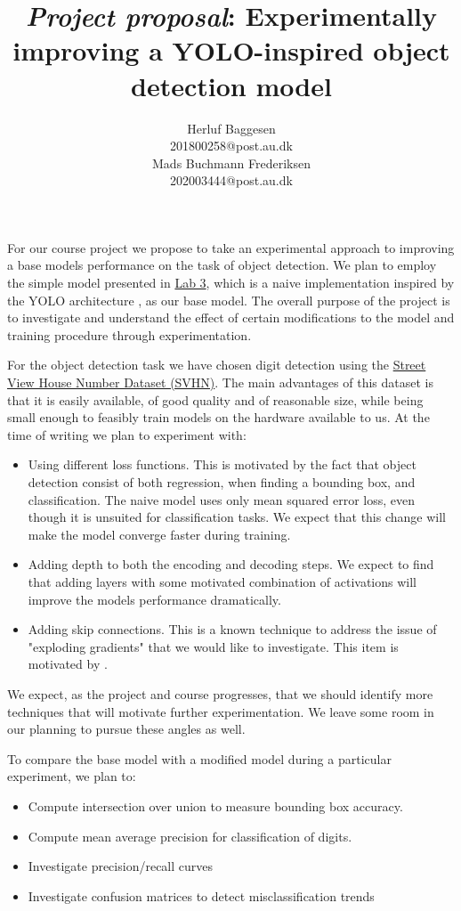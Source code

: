 \documentclass{article}
\title{\emph{Project proposal}: Experimentally improving a YOLO-inspired object detection model}
\author{
	Herluf Baggesen \\
	201800258@post.au.dk \\
	\And
	Mads Buchmann Frederiksen \\
	202003444@post.au.dk\\
}
\date{}
\begin{document}
\maketitle

For our course project we propose to take an experimental approach to improving a base models performance on the task of object detection. We plan to employ the simple model presented in \href{https://github.com/klaverhenrik/Deep-Learing-for-Visual-Recognition-2022/blob/main/Lab3_FunWithMNIST.ipynb}{Lab 3}, which is a naive implementation inspired by the YOLO architecture \citep{YOLO}, as our base model. The overall purpose of the project is to investigate and understand the effect of certain modifications to the model and training procedure through experimentation. 

For the object detection task we have chosen digit detection using the \href{http://ufldl.stanford.edu/housenumbers/}{Street View House Number Dataset (SVHN)}. The main advantages of this dataset is that it is easily available, of good quality and of reasonable size, while being small enough to feasibly train models on the hardware available to us.
At the time of writing we plan to experiment with:
\begin{itemize}
\item Using different loss functions. This is motivated by the fact that object detection consist of both regression, when finding a bounding box, and classification. The naive model uses only mean squared error loss, even though it is unsuited for classification tasks. We expect that this change will make the model converge faster during training.
\item Adding depth to both the encoding and decoding steps. We expect to find that adding layers with some motivated combination of activations will improve the models performance dramatically.
\item Adding skip connections. This is a known technique to address the issue of "exploding gradients" that we would like to investigate. This item is motivated by \citep{SGP}.
\end{itemize}

We expect, as the project and course progresses, that we should identify more techniques that will motivate further experimentation. We leave some room in our planning to pursue these angles as well. 

To compare the base model with a modified model during a particular experiment, we plan to:
\begin{itemize}
	\item Compute intersection over union to measure bounding box accuracy.
	\item Compute mean average precision for classification of digits.
	\item Investigate precision/recall curves
	\item Investigate confusion matrices to detect misclassification trends
\end{itemize}
\end{document}
